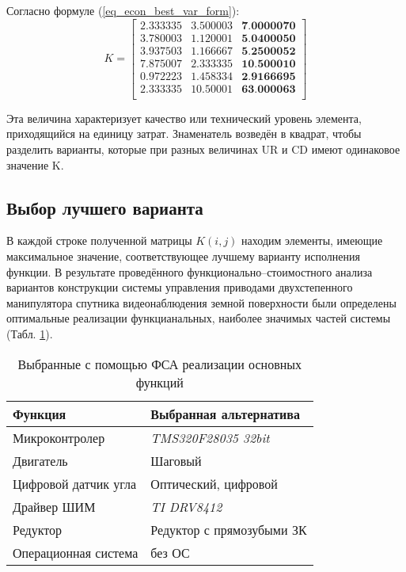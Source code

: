 Согласно формуле (\ref{eq_econ_best_var_form}):
\begin{equation}
    K =
        \begin{bmatrix}
            2.333335 & 3.500003 & \textbf{7.0000070} \\
            3.780003 & 1.120001 & \textbf{5.0400050} \\
            3.937503 & 1.166667 & \textbf{5.2500052} \\
            7.875007 & 2.333335 & \textbf{10.500010} \\
            0.972223 & 1.458334 & \textbf{2.9166695} \\
            2.333335 & 10.50001 & \textbf{63.000063} \\
        \end{bmatrix}
    \label{eq_econ_best_var}
\end{equation}

Эта величина характеризует качество или технический уровень
элемента, приходящийся на единицу затрат. Знаменатель возведён в квадрат,
чтобы разделить варианты, которые при разных величинах UR и CD имеют
одинаковое значение K.

\newpage
\subsection{Выбор лучшего варианта}
В каждой строке полученной матрицы $K(i, j)$ находим элементы,
имеющие максимальное значение, соответствующее лучшему варианту
исполнения функции.
В результате проведённого функционально--стоимостного анализа
вариантов конструкции системы управления приводами двухстепенного манипулятора
спутника видеонаблюдения земной поверхности были определены оптимальные
реализации функцианальных, наиболее значимых частей системы
(Табл. \ref{tbl_econ_result}).

\begin{table}[H]
    \centering
    \begin{tabular}{|l|l|}
        \hline
        Функция & Выбранная альтернатива \\
        \hline
        \hline
        Микроконтролер & \textit{TMS320F28035 32bit} \\
        \hline
        Двигатель & Шаговый \\
        \hline
        Цифровой датчик угла & Оптический, цифровой \\
        \hline
        Драйвер ШИМ & \textit{TI DRV8412} \\
        \hline
        Редуктор & Редуктор с прямозубыми ЗК \\
        \hline
        Операционная система & без ОС \\
        \hline
    \end{tabular}
    \caption{Выбранные с помощью ФСА реализации основных функций}
    \label{tbl_econ_result}
\end{table}

